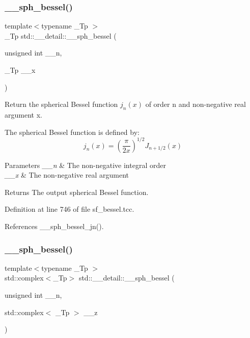 \subsubsection{\texorpdfstring{\+\_\+\+\_\+sph\+\_\+bessel()}{\_\_sph\_bessel()}\hspace{0.1cm}{\footnotesize\ttfamily [1/2]}}
{\footnotesize\ttfamily template$<$typename \+\_\+\+Tp $>$ \\
\+\_\+\+Tp std\+::\+\_\+\+\_\+detail\+::\+\_\+\+\_\+sph\+\_\+bessel (\begin{DoxyParamCaption}\item[{unsigned int}]{\+\_\+\+\_\+n,  }\item[{\+\_\+\+Tp}]{\+\_\+\+\_\+x }\end{DoxyParamCaption})}



Return the spherical Bessel function $ j_n(x) $ of order n and non-\/negative real argument {\ttfamily x}. 

The spherical Bessel function is defined by\+: \[ j_n(x) = \left(\frac{\pi}{2x} \right) ^{1/2} J_{n+1/2}(x) \]


\begin{DoxyParams}{Parameters}
{\em \+\_\+\+\_\+n} & The non-\/negative integral order \\
\hline
{\em \+\_\+\+\_\+x} & The non-\/negative real argument \\
\hline
\end{DoxyParams}
\begin{DoxyReturn}{Returns}
The output spherical Bessel function. 
\end{DoxyReturn}


Definition at line 746 of file sf\+\_\+bessel.\+tcc.



References \+\_\+\+\_\+sph\+\_\+bessel\+\_\+jn().

\mbox{\label{namespacestd_1_1____detail_a28646bd01903e6da9871069a9363c593}} 
\subsubsection{\texorpdfstring{\+\_\+\+\_\+sph\+\_\+bessel()}{\_\_sph\_bessel()}\hspace{0.1cm}{\footnotesize\ttfamily [2/2]}}
{\footnotesize\ttfamily template$<$typename \+\_\+\+Tp $>$ \\
std\+::complex$<$\+\_\+\+Tp$>$ std\+::\+\_\+\+\_\+detail\+::\+\_\+\+\_\+sph\+\_\+bessel (\begin{DoxyParamCaption}\item[{unsigned int}]{\+\_\+\+\_\+n,  }\item[{std\+::complex$<$ \+\_\+\+Tp $>$}]{\+\_\+\+\_\+z }\end{DoxyParamCaption})}



